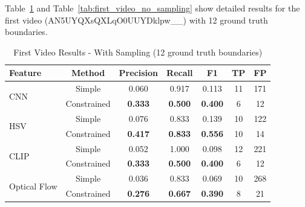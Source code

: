 \documentclass[11pt,a4paper]{article}
\begin{document}
Table~\ref{tab:first_video_sampling} and Table~\ref{tab:first_video_no_sampling} show detailed results for the first video (AN5UYQXsQXLqO0UUYDklpw\_\_) with 12 ground truth boundaries.

\begin{table}[H]
\centering
\caption{First Video Results - With Sampling (12 ground truth boundaries)}
\label{tab:first_video_sampling}
\small
\begin{tabular}{lcccccc}
\toprule
\textbf{Feature} & \textbf{Method} & \textbf{Precision} & \textbf{Recall} & \textbf{F1} & \textbf{TP} & \textbf{FP} \\
\midrule
\multirow{2}{*}{CNN} & Simple & 0.060 & 0.917 & 0.113 & 11 & 171 \\
                     & Constrained & \textbf{0.333} & \textbf{0.500} & \textbf{0.400} & 6 & 12 \\
\midrule
\multirow{2}{*}{HSV} & Simple & 0.076 & 0.833 & 0.139 & 10 & 122 \\
                     & Constrained & \textbf{0.417} & \textbf{0.833} & \textbf{0.556} & 10 & 14 \\
\midrule
\multirow{2}{*}{CLIP} & Simple & 0.052 & 1.000 & 0.098 & 12 & 221 \\
                      & Constrained & \textbf{0.333} & \textbf{0.500} & \textbf{0.400} & 6 & 12 \\
\midrule
\multirow{2}{*}{Optical Flow} & Simple & 0.036 & 0.833 & 0.069 & 10 & 268 \\
                              & Constrained & \textbf{0.276} & \textbf{0.667} & \textbf{0.390} & 8 & 21 \\
\bottomrule
\end{tabular}
\end{table}
\end{document}
